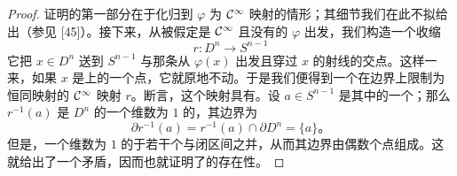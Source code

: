 \begin{proof}
证明的第一部分在于化归到 $\varphi$ 为 $\mathcal{C}^\infty$ 映射的情形；其细节我们在此不拟给出（参见 [45]）。接下来，从被假定是 $\mathcal{C}^\infty$ 且没有\trFixedPoint{}的 $\varphi$ 出发，我们构造一个收缩
\[
r\colon D^n\longrightarrow S^{n-1}
\]
它把 $x\in D^n$ 送到\trSphere{} $S^{n-1}$ 与那条从 $\varphi(x)$ 出发且穿过 $x$ 的射线的交点。这样一来，如果 $x$ 是\trSphere{}上的一个点，它就原地不动。于是我们便得到一个在边界上限制为恒同映射的 $\mathcal{C}^\infty$ 映射 $r$。\trSardTheorem{}断言，这个映射具有\trRegularValue。设 $a\in S^{n-1}$ 是其中的一个；那么 $r^{-1}(a)$ 是 $D^n$ 的一个维数为 $1$ 的\trSubmanifold，其边界为
\[
\partial r^{-1}(a)=r^{-1}(a)\cap\partial D^n=\{a\}\text{。}
\]
但是，一个维数为 $1$ 的\trManifoldWithBoundary{}\trDiffeomorphic{}于若干个\trCircle{}与闭区间之并，从而其边界由偶数个点组成。这就给出了一个矛盾，因而也就证明了\trFixedPoint{}的存在性。
\end{proof}
